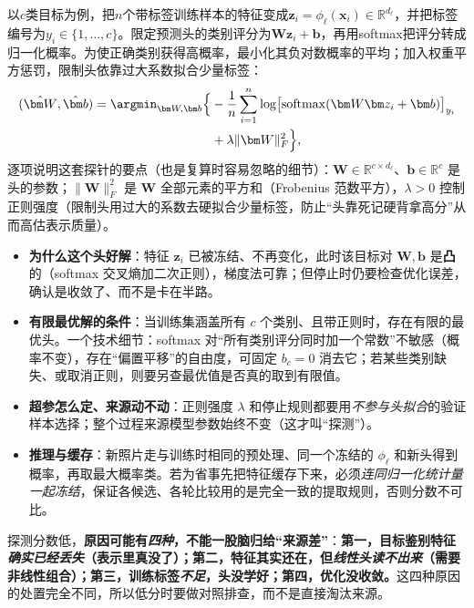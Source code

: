 以$c$类目标为例，把$n$个带标签训练样本的特征变成$\bm z_i=\phi_\ell(\bm x_i)\in\mathbb R^{d_\ell}$，并把标签编号为$y_i\in\{1,\ldots,c\}$。限定预测头的类别评分为$\bm W\bm z_i+\bm b$，再用softmax把评分转成归一化概率。为使正确类别获得高概率，最小化其负对数概率的平均；加入权重平方惩罚，限制头依靠过大系数拟合少量标签：
\begin{equation}
  \begin{aligned}
    (\hat{\bm W},\hat{\bm b})
    =\argmin_{\bm W,\bm b}\Bigl\{
    &-\frac{1}{n}\sum_{i=1}^{n}
    \log\bigl[\operatorname{softmax}
    (\bm W\bm z_i+\bm b)\bigr]_{y_i}\\
    &+\lambda\lVert\bm W\rVert_F^2\Bigr\},
  \end{aligned}
  \label{eq:ket-reuse-linear-probe}
\end{equation}
逐项说明这套探针的要点（也是复算时容易忽略的细节）：$\bm W\in\mathbb R^{c\times d_\ell}$、$\bm b\in\mathbb R^c$ 是头的参数；$\lVert\bm W\rVert_F^2$ 是 $\bm W$ 全部元素的平方和（Frobenius 范数平方），$\lambda>0$ 控制正则强度（限制头用过大的系数去硬拟合少量标签，防止“头靠死记硬背拿高分”从而高估表示质量）。
\begin{itemize}\item \textbf{为什么这个头好解}：特征 $\bm z_i$ 已被冻结、不再变化，此时该目标对 $\bm W,\bm b$ 是\textbf{凸}的（softmax 交叉熵加二次正则），梯度法可靠；但停止时仍要检查优化误差，确认是收敛了、而不是卡在半路。\item \textbf{有限最优解的条件}：当训练集涵盖所有 $c$ 个类别、且带正则时，存在有限的最优头。一个技术细节：softmax 对“所有类别评分同时加一个常数”不敏感（概率不变），存在“偏置平移”的自由度，可固定 $b_c=0$ 消去它；若某些类别缺失、或取消正则，则要另查最优值是否真的取到有限值。\item \textbf{超参怎么定、来源动不动}：正则强度 $\lambda$ 和停止规则都要用\emph{不参与头拟合}的验证样本选择；整个过程来源模型参数始终不变（这才叫“探测”）。\item \textbf{推理与缓存}：新照片走与训练时相同的预处理、同一个冻结的 $\phi_\ell$ 和新头得到概率，再取最大概率类。若为省事先把特征缓存下来，必须\emph{连同归一化统计量一起冻结}，保证各候选、各轮比较用的是完全一致的提取规则，否则分数不可比。\end{itemize}

探测分数低，\textbf{原因可能有\emph{四种}，不能一股脑归给“来源差”}：\textbf{第一，目标鉴别特征\emph{确实已经丢失}（表示里真没了）；第二，特征其实还在，但\emph{线性头读不出来}（需要非线性组合）；第三，训练标签\emph{不足}，头没学好；第四，优化没收敛。}这四种原因的处置完全不同，所以低分时要做对照排查，而不是直接淘汰来源。

